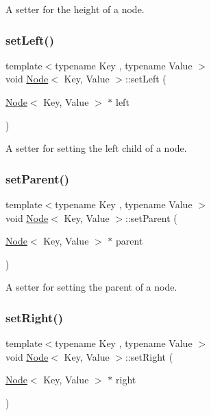 A setter for the height of a node. \mbox{\label{classNode_af0a4ecd342adca0c1db88f0811ad0068}} 
\subsubsection{\texorpdfstring{set\+Left()}{setLeft()}}
{\footnotesize\ttfamily template$<$typename Key , typename Value $>$ \\
void \mbox{\hyperlink{classNode}{Node}}$<$ Key, Value $>$\+::set\+Left (\begin{DoxyParamCaption}\item[{\mbox{\hyperlink{classNode}{Node}}$<$ Key, Value $>$ $\ast$}]{left }\end{DoxyParamCaption})}

A setter for setting the left child of a node. \mbox{\label{classNode_a981799e30e7649812c2ad3a2d43c3f94}} 
\subsubsection{\texorpdfstring{set\+Parent()}{setParent()}}
{\footnotesize\ttfamily template$<$typename Key , typename Value $>$ \\
void \mbox{\hyperlink{classNode}{Node}}$<$ Key, Value $>$\+::set\+Parent (\begin{DoxyParamCaption}\item[{\mbox{\hyperlink{classNode}{Node}}$<$ Key, Value $>$ $\ast$}]{parent }\end{DoxyParamCaption})}

A setter for setting the parent of a node. \mbox{\label{classNode_ade5c16875afa559250c7a49d56007685}} 
\subsubsection{\texorpdfstring{set\+Right()}{setRight()}}
{\footnotesize\ttfamily template$<$typename Key , typename Value $>$ \\
void \mbox{\hyperlink{classNode}{Node}}$<$ Key, Value $>$\+::set\+Right (\begin{DoxyParamCaption}\item[{\mbox{\hyperlink{classNode}{Node}}$<$ Key, Value $>$ $\ast$}]{right }\end{DoxyParamCaption})}

